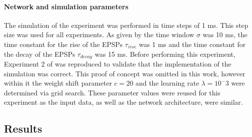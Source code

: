 \paragraph{Network and simulation parameters}

The simulation of the experiment was performed in time steps of 1 ms. This step size was used for all experiments. As given by \citet{nessler} the time window $\sigma$ was 10 ms, the time constant for the rise of the EPSPs $\tau_{rise}$ was 1 ms and the time constant for the decay of the EPSPs $\tau_{decay}$ was 15 ms. Before performing this experiment, Experiment 2 of \citet{nessler} was reproduced to validate that the implementation of the simulation was correct. This proof of concept was omitted in this work, however within it the weight shift parameter $c = 20$ and the learning rate $\lambda = 10^-3$ were determined via grid search. These parameter values were reused for this experiment as the input data, as well as the network architecture, were similar.

\subsection{Results}

